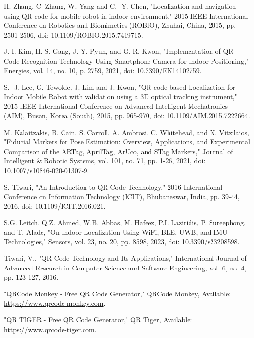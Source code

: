 
\newpage
{}
\renewcommand{\bibname}{References}

\begin{thebibliography}{9}
	H. Zhang, C. Zhang, W. Yang and C. -Y. Chen, "Localization and navigation using QR code for mobile robot in indoor environment," 2015 IEEE International Conference on Robotics and Biomimetics (ROBIO), Zhuhai, China, 2015, pp. 2501-2506, doi: 10.1109/ROBIO.2015.7419715.
	
	J.-I. Kim, H.-S. Gang, J.-Y. Pyun, and G.-R. Kwon, "Implementation of QR Code Recognition Technology Using Smartphone Camera for Indoor Positioning," Energies, vol. 14, no. 10, p. 2759, 2021, doi: 10.3390/EN14102759.
	
	S. -J. Lee, G. Tewolde, J. Lim and J. Kwon, "QR-code based Localization for Indoor Mobile Robot with validation using a 3D optical tracking instrument," 2015 IEEE International Conference on Advanced Intelligent Mechatronics (AIM), Busan, Korea (South), 2015, pp. 965-970, doi: 10.1109/AIM.2015.7222664.
	
	M. Kalaitzakis, B. Cain, S. Carroll, A. Ambrosi, C. Whitehead, and N. Vitzilaios, "Fiducial Markers for Pose Estimation: Overview, Applications, and Experimental Comparison of the ARTag, AprilTag, ArUco, and STag Markers," Journal of Intelligent \& Robotic Systems, vol. 101, no. 71, pp. 1-26, 2021, doi: 10.1007/s10846-020-01307-9.
	
	S. Tiwari, "An Introduction to QR Code Technology," 2016 International Conference on Information Technology (ICIT), Bhubaneswar, India, pp. 39-44, 2016, doi: 10.1109/ICIT.2016.021.
	
	 S.G. Leitch, Q.Z. Ahmed, W.B. Abbas, M. Hafeez, P.I. Laziridis, P. Sureephong, and T. Alade, "On Indoor Localization Using WiFi, BLE, UWB, and IMU Technologies," Sensors, vol. 23, no. 20, pp. 8598, 2023, doi: 10.3390/s23208598.
	
	 Tiwari, V., "QR Code Technology and Its Applications," International Journal of Advanced Research in Computer Science and Software Engineering, vol. 6, no. 4, pp. 123-127, 2016.
	 
	
	 "QRCode Monkey - Free QR Code Generator," QRCode Monkey, Available: \url{https://www.qrcode-monkey.com}.
	
	 "QR TIGER - Free QR Code Generator," QR Tiger, Available: \url{https://www.qrcode-tiger.com}.
	

\end{thebibliography}
